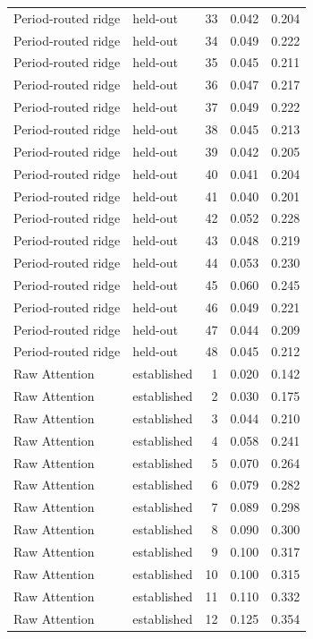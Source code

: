 \begin{tabular}{llrrr}
Period-routed ridge & held-out & 33 & 0.042 & 0.204 \\
Period-routed ridge & held-out & 34 & 0.049 & 0.222 \\
Period-routed ridge & held-out & 35 & 0.045 & 0.211 \\
Period-routed ridge & held-out & 36 & 0.047 & 0.217 \\
Period-routed ridge & held-out & 37 & 0.049 & 0.222 \\
Period-routed ridge & held-out & 38 & 0.045 & 0.213 \\
Period-routed ridge & held-out & 39 & 0.042 & 0.205 \\
Period-routed ridge & held-out & 40 & 0.041 & 0.204 \\
Period-routed ridge & held-out & 41 & 0.040 & 0.201 \\
Period-routed ridge & held-out & 42 & 0.052 & 0.228 \\
Period-routed ridge & held-out & 43 & 0.048 & 0.219 \\
Period-routed ridge & held-out & 44 & 0.053 & 0.230 \\
Period-routed ridge & held-out & 45 & 0.060 & 0.245 \\
Period-routed ridge & held-out & 46 & 0.049 & 0.221 \\
Period-routed ridge & held-out & 47 & 0.044 & 0.209 \\
Period-routed ridge & held-out & 48 & 0.045 & 0.212 \\
Raw Attention & established & 1 & 0.020 & 0.142 \\
Raw Attention & established & 2 & 0.030 & 0.175 \\
Raw Attention & established & 3 & 0.044 & 0.210 \\
Raw Attention & established & 4 & 0.058 & 0.241 \\
Raw Attention & established & 5 & 0.070 & 0.264 \\
Raw Attention & established & 6 & 0.079 & 0.282 \\
Raw Attention & established & 7 & 0.089 & 0.298 \\
Raw Attention & established & 8 & 0.090 & 0.300 \\
Raw Attention & established & 9 & 0.100 & 0.317 \\
Raw Attention & established & 10 & 0.100 & 0.315 \\
Raw Attention & established & 11 & 0.110 & 0.332 \\
Raw Attention & established & 12 & 0.125 & 0.354 \\

\end{tabular}
